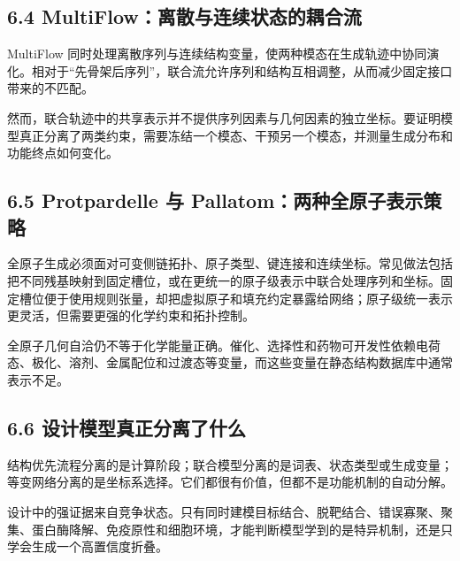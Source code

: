 \documentclass[10pt]{article}
\begin{document}
\subsection*{6.4 MultiFlow：离散与连续状态的耦合流}


MultiFlow 同时处理离散序列与连续结构变量，使两种模态在生成轨迹中协同演化。相对于“先骨架后序列”，联合流允许序列和结构互相调整，从而减少固定接口带来的不匹配。\par

然而，联合轨迹中的共享表示并不提供序列因素与几何因素的独立坐标。要证明模型真正分离了两类约束，需要冻结一个模态、干预另一个模态，并测量生成分布和功能终点如何变化。\par

\subsection*{6.5 Protpardelle 与 Pallatom：两种全原子表示策略}


全原子生成必须面对可变侧链拓扑、原子类型、键连接和连续坐标。常见做法包括把不同残基映射到固定槽位，或在更统一的原子级表示中联合处理序列和坐标。固定槽位便于使用规则张量，却把虚拟原子和填充约定暴露给网络；原子级统一表示更灵活，但需要更强的化学约束和拓扑控制。\par

全原子几何自洽仍不等于化学能量正确。催化、选择性和药物可开发性依赖电荷态、极化、溶剂、金属配位和过渡态等变量，而这些变量在静态结构数据库中通常表示不足。\par

\subsection*{6.6 设计模型真正分离了什么}


结构优先流程分离的是计算阶段；联合模型分离的是词表、状态类型或生成变量；等变网络分离的是坐标系选择。它们都很有价值，但都不是功能机制的自动分解。\par

设计中的强证据来自竞争状态。只有同时建模目标结合、脱靶结合、错误寡聚、聚集、蛋白酶降解、免疫原性和细胞环境，才能判断模型学到的是特异机制，还是只学会生成一个高置信度折叠。\par
\end{document}
